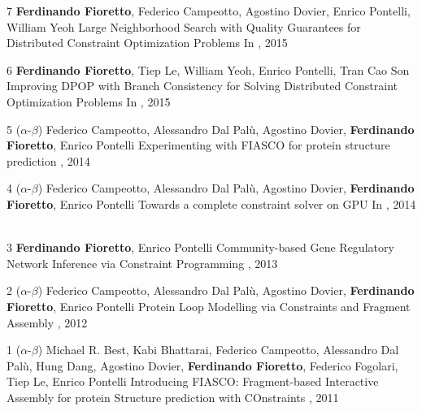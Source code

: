 \begin{pubs}
\wsentry
	{7} %
	{{\bf Ferdinando Fioretto}, Federico Campeotto, Agostino Dovier, Enrico Pontelli, William Yeoh}
	{Large Neighborhood Search with Quality Guarantees for Distributed Constraint Optimization Problems} 
	{In , 2015}
	{~}

\wsentry 
	{6} %
	{{\bf Ferdinando Fioretto}, Tiep Le, William Yeoh, Enrico Pontelli, Tran Cao Son}
	{Improving DPOP with Branch Consistency for Solving Distributed Constraint Optimization Problems}
	{In , 2015}
	{~}

\wsentry 
	{5} %
	{($\alpha$-$\beta$) 
	Federico Campeotto, Alessandro Dal Pal\`{u}, Agostino Dovier, {\bf Ferdinando Fioretto}, Enrico Pontelli} 
  	{Experimenting with FIASCO for protein structure prediction}
	{, 2014}
	{~}

\wsentry 
	{4} %
	{($\alpha$-$\beta$) Federico Campeotto, Alessandro Dal Pal\`{u}, Agostino Dovier, {\bf Ferdinando Fioretto}, Enrico Pontelli}
	{Towards a complete constraint solver on GPU}
	{In , 2014}
	{~}

\wsentry 
	{3} %
	{{\bf Ferdinando Fioretto}, Enrico Pontelli}
	{Community-based Gene Regulatory Network Inference via Constraint Programming}
	{, 2013}
	{~} 

\wsentry
	{2} %
	{($\alpha$-$\beta$) 
	Federico Campeotto, Alessandro Dal Pal\`{u}, Agostino Dovier, {\bf Ferdinando Fioretto}, Enrico Pontelli}
	{Protein Loop Modelling via Constraints and Fragment Assembly}
	{, 2012}
	{~} 

\wsentry 
	{1} %
	{($\alpha$-$\beta$) 
	Michael R. Best, Kabi Bhattarai, Federico Campeotto, Alessandro Dal Pal\`{u}, Hung Dang, Agostino Dovier, {\bf Ferdinando Fioretto}, Federico Fogolari, Tiep Le, Enrico Pontelli}
		{Introducing FIASCO: Fragment-based Interactive Assembly for protein Structure prediction with COnstraints}
 	 {, 2011}
  	{~}
\end{pubs}


